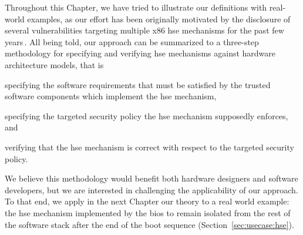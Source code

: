 Throughout this Chapter, we have tried to illustrate our definitions with
real-world examples, as our effort has been originally motivated by the
disclosure of several vulnerabilities targeting multiple x86 \ac{hse} mechanisms
for the past few
years\,\cite{wojtczuk2009smram,duflot2009smram,rutkowska2008remap,domas2015sinkhole,kallenberg2015racecondition}.
%
All being told, our approach can be summarized to a three-step methodology for
specifying and verifying \ac{hse} mechanisms against hardware architecture
models, that is
%
\begin{inparaenum}[(1)]
\item specifying the software requirements that must be satisfied by the trusted
  software components which implement the \ac{hse} mechanism,
%
\item specifying the targeted security policy the \ac{hse} mechanism supposedly
  enforces, and
%
\item verifying that the \ac{hse} mechanism is correct with respect to the
  targeted security policy.
\end{inparaenum}
%
We believe this methodology would benefit both hardware designers and software
developers, but we are interested in challenging the applicability of our
approach.
%
To that end, we apply in the next Chapter our theory to a real world example:
the \ac{hse} mechanism implemented by the \ac{bios} to remain isolated from the
rest of the software stack after the end of the boot sequence
(Section~\ref{sec:usecase:hse}).
